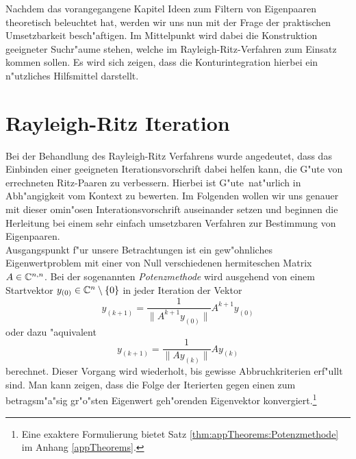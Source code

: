 Nachdem das vorangegangene Kapitel Ideen zum Filtern von Eigenpaaren theoretisch beleuchtet hat, werden wir uns nun mit der Frage der praktischen Umsetzbarkeit besch"aftigen.
Im Mittelpunkt wird dabei die Konstruktion geeigneter Suchr"aume stehen, welche im Rayleigh-Ritz-Verfahren zum Einsatz kommen sollen.
Es wird sich zeigen, dass die Konturintegration hierbei ein n"utzliches Hilfsmittel darstellt.

\section{Rayleigh-Ritz Iteration}\label{chap4:beschrr}



Bei der Behandlung des Rayleigh-Ritz Verfahrens wurde angedeutet, dass das Einbinden einer geeigneten Iterationsvorschrift dabei helfen kann, die G"ute von errechneten Ritz-Paaren zu verbessern.
Hierbei ist \glqq G"ute\grqq\ nat"urlich in Abh"angigkeit vom Kontext zu bewerten. Im Folgenden wollen wir uns genauer mit dieser omin"osen Interationsvorschrift auseinander setzen und beginnen die Herleitung bei einem sehr einfach umsetzbaren Verfahren zur Bestimmung von Eigenpaaren.\\


Ausgangspunkt f"ur unsere Betrachtungen ist ein gew"ohnliches Eigenwertproblem mit einer von Null verschiedenen hermiteschen Matrix $A\in\mathbb{C}^{n,n}$. Bei der sogenannten \emph{Potenzmethode} wird
ausgehend von einem Startvektor $y_{(0)}\in\mathbb{C}^n \setminus\{0\}$ in jeder Iteration der Vektor
\[
y_{(k+1)} = \frac{1}{\|A^{k+1} y_{(0)}\|} A^{k+1}y_{(0)}
\]
oder dazu "aquivalent
\[
y_{(k+1)} = \frac{1}{\|Ay_{(k)}\|} Ay_{(k)}
\]
berechnet. Dieser Vorgang wird wiederholt, bis gewisse Abbruchkriterien erf"ullt sind. Man kann zeigen, dass die Folge der Iterierten gegen einen zum betragsm"a"sig gr"o"sten Eigenwert geh"orenden Eigenvektor konvergiert.\footnote{Eine exaktere Formulierung bietet Satz \ref{thm:appTheorems:Potenzmethode} im Anhang \ref{appTheorems}.}

